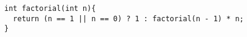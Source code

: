\begin{verbatim}
int factorial(int n){
  return (n == 1 || n == 0) ? 1 : factorial(n - 1) * n;
}
\end{verbatim}